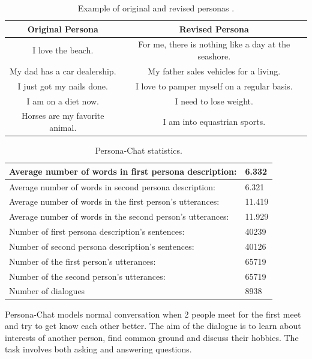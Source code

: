 \begin{table}[t]
\centering
  \begin{tabular}{ |c|c| } 
   \hline\hline
   \textbf{Original Persona} & \textbf{Revised Persona}  \\ 
   \hline\hline
   I love the beach. & For me, there is nothing like a day at the seashore. \\ 
   My dad has a car dealership. & My father sales vehicles for a living.  \\
   I just got my nails done. & I love to pamper myself on a regular basis. \\
   I am on a diet now. & I need to lose weight. \\
   Horses are my favorite animal. & I am into equastrian sports. \\ 
   \hline
  \end{tabular}
  \caption{Example of original and revised personas \cite{zhang2018personalizing}.}
\label{tab:persona_revised}
\end{table}

\begin{table}[t]
\centering
  \begin{tabular}{|p{8cm}|p{2cm}|} 
  \hline
  Average number of words in first persona description: & 6.332 \\
  \hline
  Average number of words in second persona description: & 6.321 \\
  \hline
  Average number of words in the first person's utterances: & 11.419 \\
  \hline
  Average number of words in the second person's utterances: & 11.929 \\
  \hline
  Number of first persona description's sentences: & 40239 \\
  \hline
  Number of second persona description's sentences: & 40126 \\
  \hline
  Number of the first person's utterances: & 65719 \\
  \hline
  Number of the second person's utterances:  & 65719 \\
  \hline
  Number of dialogues & 8938 \\
  \hline
  \end{tabular}
  \caption{Persona-Chat statistics.}
\label{tab:persona_chat_statistics}
\end{table}

Persona-Chat models normal conversation when 2 people meet for the first meet and try to get know each other better. The aim of the dialogue is to learn about interests of another person, find common ground and discuss their hobbies. The task involves both asking and answering questions. 

